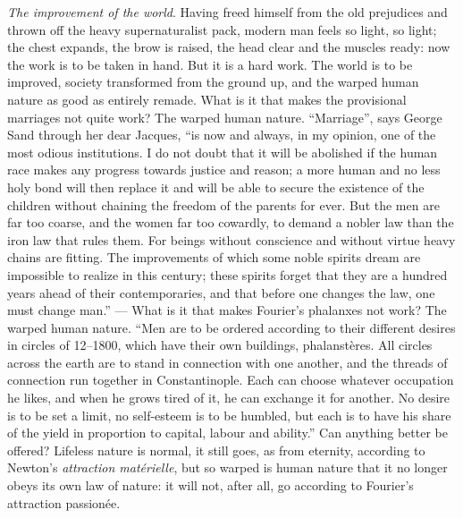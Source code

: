 \documentclass[12pt,a4paper,openany]{book}
\newcommand{\opage}[1]{\marginnote{\footnotesize\textit{[#1]}}}
\begin{document}
\emph{The improvement of the world}. Having freed
himself from the old prejudices and thrown off the heavy
supernaturalist pack, modern
man feels so light, so light; the chest expands, the brow
is raised, the head clear and the muscles ready: now
the work is to be taken in hand. But it is a hard work.
The world is to be improved, society transformed from
the ground up, and the warped human nature as
good as entirely remade. What is it that makes
the provisional marriages not quite work?
The warped human nature. ``Marriage'', says
George Sand through her dear Jacques, ``is now and
always, in my opinion, one of the most odious institutions.
I do not doubt that it will be abolished
if the human race makes any progress towards
justice and reason; a more human and no
less holy bond will then replace it and will be able
to secure the existence of the children without
chaining the freedom of the parents for ever. But the men are
far too coarse, and the women far too cowardly, to demand a %
nobler law than the iron law that rules them.
\setcounter{footnote}{0}%
\opage{87}For beings without conscience and without virtue heavy
chains are fitting. The improvements of which some noble spirits
dream are impossible to realize in this
century; these spirits forget that they are a hundred
years ahead of their contemporaries, and that before one changes
the law, one must change man.'' --- What
is it that makes Fourier's phalanxes not work?
The warped human nature. ``Men
are to be ordered according to their different desires in
circles of 12--1800, which have their own buildings,
phalanstères. All circles across the earth are to stand
in connection with one another, and the threads of connection
run together in Constantinople. Each can choose whatever
occupation he likes, and when he grows tired of
it, he can exchange it for another. No desire
is to be set a limit, no self-esteem
is to be humbled, but each is to have his share of the yield
in proportion to capital, labour and ability.'' Can
anything better be offered? Lifeless nature is normal,
it still goes, as from eternity, according to Newton's \emph{attraction matérielle}, but so warped is human
nature that it no longer obeys its own
law of nature: it will not, after all, go according to Fourier's attraction
passionée.
\end{document}
